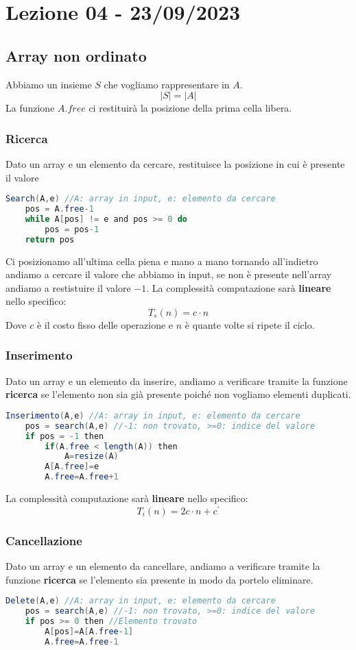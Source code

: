 \section{Lezione 04 - 23/09/2023}
\subsection{Array non ordinato}
Abbiamo un insieme $S$ che vogliamo rappresentare in $A$.\\
$$ |S| = |A| $$
La funzione $A.free$ ci restituirà la posizione della prima cella libera.\\


\subsubsection{Ricerca}
Dato un array e un elemento da cercare, restituisce la posizione in cui è presente il valore
\begin{lstlisting}[language=Java]
Search(A,e) //A: array in input, e: elemento da cercare
	pos = A.free-1
	while A[pos] != e and pos >= 0 do
		pos = pos-1
	return pos
\end{lstlisting}
Ci posizionamo all'ultima cella piena e mano a mano tornando all'indietro andiamo a cercare il valore che abbiamo in input, se non è presente nell'array andiamo a restistuire il valore $-1$. 
La complessità computazione sarà \textbf{lineare} nello specifico:
$$ T_s(n)=c \cdot n $$
Dove $c$ è il costo fisso delle operazione e $n$ è quante volte si ripete il ciclo.

\subsubsection{Inserimento}
Dato un array e un elemento da inserire, andiamo a verificare tramite la funzione \textbf{ricerca} se l'elemento non sia già presente poiché non vogliamo elementi duplicati.
\begin{lstlisting}[language=Java]
Inserimento(A,e) //A: array in input, e: elemento da cercare
	pos = search(A,e) //-1: non trovato, >=0: indice del valore
	if pos = -1 then
		if(A.free < length(A)) then
			A=resize(A)
		A[A.free]=e
		A.free=A.free+1
\end{lstlisting}
La complessità computazione sarà \textbf{lineare} nello specifico:
$$ T_i(n)=2c \cdot n + c^{\prime} $$
\newpage

\subsubsection{Cancellazione}
Dato un array e un elemento da cancellare, andiamo a verificare tramite la funzione \textbf{ricerca} se l'elemento sia presente in modo da portelo eliminare.
\begin{lstlisting}[language=Java]
Delete(A,e) //A: array in input, e: elemento da cercare
	pos = search(A,e) //-1: non trovato, >=0: indice del valore
	if pos >= 0 then //Elemento trovato
		A[pos]=A[A.free-1]
		A.free=A.free-1
\end{lstlisting}

